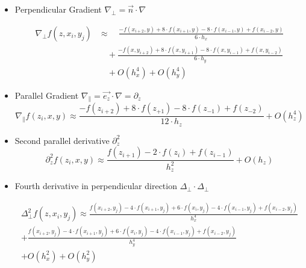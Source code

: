 \documentclass[master.tex]{subfiles}
\begin{document}
\begin{itemize}
    \item Perpendicular Gradient $\nabla_{\perp} = \vec{n}\cdot\nabla$\\
     \begin{small}
        \begin{equation}
        \begin{split}
            \nabla_{\perp} f(z, x_i,y_j) &\approx  \quad\frac{-f(x_{i+2},y) + 8 \cdot f(x_{i + 1}, y) -  8 \cdot f(x_{i - 1}, y) + f(x_{i - 2}, y)}{6 \cdot h_x} \\
            &\quad + \frac{-f(x,y_{i + 2}) + 8 \cdot f(x, y_{i + 1}) -  8 \cdot f(x, y_{i - 1}) + f(x, y_{i - 2})}{6 \cdot h_y}\\
            &\quad + O(h_x^4) + O(h_y^4)
        \end{split}
        \end{equation}
    \end{small}
    \item Parallel Gradient $\nabla_{\parallel} = \vec{e_z}\cdot\nabla = \partial_z$\\
    \begin{equation}
        \nabla_{\parallel} f(z_i,x,y) \approx \frac{-f(z_{i+2}) + 8 \cdot f(z_{+1}) - 8 \cdot f(z_{-1}) + f(z_{-2})}{12 \cdot h_z} + O(h_z^4)
    \end{equation}
    \item Second parallel derivative $\partial_z^2$\\
    \begin{equation}
           \partial_z^2f(z_i,x,y) \approx \frac{f(z_{i+1})-2\cdot f(z_i)+ f(z_{i-1})}{h_z^2} + O(h_z)
    \end{equation}
    \item Fourth derivative in perpendicular direction $\Delta_\perp \cdot \Delta_\perp$\\
    \begin{footnotesize}
    \begin{equation}
    \begin{split}
    \Delta_\perp^2f(z,x_i,y_j) \approx \frac{f(x_{i+2},y_j) - 4 \cdot f(x_{i+1},y_j) +6\cdot f(x_i,y_j) -4 \cdot f(x_{i-1},y_j) + f(x_{i-2}, y_j)}{h_x^4}  \\ + \frac{f(x_{i+2},y_j) - 4 \cdot f(x_{i+1},y_j) +6\cdot f(x_i,y_j) -4 \cdot f(x_{i-1},y_j) + f(x_{i-2}, y_j)}{h_y^4}  \\  + O(h_x^2) + O(h_y^2)
    \end{split}
    \end{equation}

\end{footnotesize}
\end{itemize}
\end{document}
